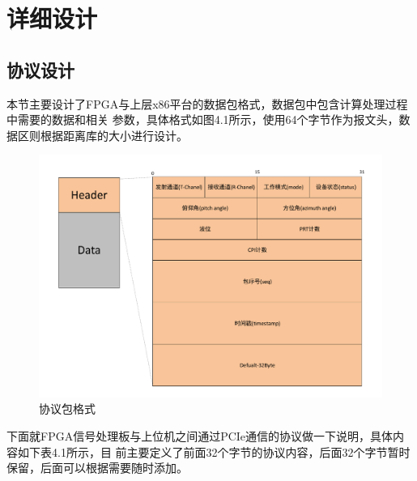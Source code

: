 \documentclass[a4paper,12pt]{report}
\begin{document}
\chapter{详细设计}
\begin{spacing}{1.5}       

\section{协议设计}
本节主要设计了FPGA与上层x86平台的数据包格式，数据包中包含计算处理过程中需要的数据和相关
参数，具体格式如图4.1所示，使用64个字节作为报文头，数据区则根据距离库的大小进行设计。

\begin{figure}[htbp]
    \centering
    \includegraphics [width=1.0\textwidth]{figure//header.pdf}
    \caption{协议包格式}\label{header}
\end{figure}

下面就FPGA信号处理板与上位机之间通过PCIe通信的协议做一下说明，具体内容如下表4.1所示，目
前主要定义了前面32个字节的协议内容，后面32个字节暂时保留，后面可以根据需要随时添加。


\end{spacing}
\end{document}
